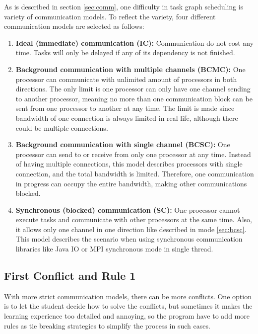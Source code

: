 \documentclass[msc,deptreport, cs]{infthesis}
\begin{document}
As is described in section \ref{sec:comm}, one difficulty in task graph scheduling is variety of communication models. To reflect the variety, four different communication models are selected as follows:

\begin{enumerate}
  \item \textbf{Ideal (immediate) communication (IC):} Communication do not cost any time. Tasks will only be delayed if any of its dependency is not finished.
  \item \textbf{Background communication with multiple channels (BCMC):} One processor can communicate with unlimited amount of processors in both directions. The only limit is one processor can only have one channel sending to another processor, meaning no more than one communication block can be sent from one processor to another at any time. The limit is made since bandwidth of one connection is always limited in real life, although there could be multiple connections.
  \item \label{sec:bcsc} \textbf{Background communication with single channel (BCSC):} One processor can send to or receive from only one processor at any time. Instead of having multiple connections, this model describes processors with single connection, and the total bandwidth is limited. Therefore, one communication in progress can occupy the entire bandwidth, making other communications blocked.
  \item \textbf{Synchronous (blocked) communication (SC):} One processor cannot execute tasks and communicate with other processors at the same time. Also, it allows only one channel in one direction like described in mode \ref{sec:bcsc}. This model describes the scenario when using synchronous communication libraries like Java IO or MPI synchronous mode in single thread.
\end{enumerate}

\subsection{First Conflict and Rule 1}

With more strict communication models, there can be more conflicts. One option is to let the student decide how to solve the conflicts, but sometimes it makes the learning experience too detailed and annoying, so the program have to add more rules as tie breaking strategies to simplify the process in such cases.
\end{document}

